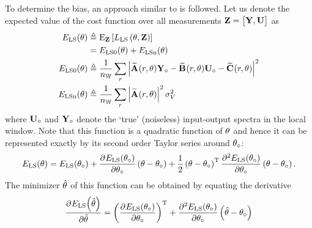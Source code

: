 To determine the bias, an approach similar to \citep[Appendix A]{Guillaume1995} is followed.
Let us denote the expected value of the cost function over all measurements $\LocalVector{Z} = \mat{\LocalMatrix{Y}, \LocalMatrix{U}}$ as
\begin{align}
  \ELSCost{\theta}
              & \isdef 
                   \E[\LocalVector{Z}]%
                         {    
                                \LSCost{\LocalVector{\theta}, \LocalVector{Z}}} \\
              & = \ELSCost[0]{\theta} + \ELSCost[n]{\theta} \\
    \ELSCost[0]{\theta} & \isdef 
            \frac{1}{\nWind} 
                \sum_{r} 
                     \left| 
                             \LocalModel{A}(r, \LocalVector{\theta}) \true{\LocalVector{Y}}
                          - \LocalModel{B}(r, \LocalVector{\theta}) \true{\LocalVector{U}}
                          - \LocalModel{C}(r, \LocalVector{\theta}) 
                    \right|^2 \\
    \ELSCost[n]{\theta} & \isdef 
              \frac{1}{\nWind} 
                     \sum_{r} 
                              \left| \LocalModel{A}(r,\LocalVector{\theta}) \right|^2 
                              \sigma_V^2
\end{align}
where $\true{\LocalVector{U}}$ and $\true{\LocalVector{Y}}$ denote the `true' (noiseless) input-output spectra in the local window.
Note that this function is a quadratic function of $\LocalVector{\theta}$ and hence it can be represented exactly by its second order Taylor series around $\true\theta$:
\begin{multline}
  \ELSCost{\theta} = \ELSCost{\true\theta} 
  + \PartialDerivative{\ELSCost{\true\theta}}{\true\theta}  \left( \theta - \true\theta \right) %
  + \frac{1}{2} \left( \theta - \true\theta \right)^{\T} 
  \PartialDerivative[2]{\ELSCost{\true\theta}}{\true\theta} 
   \left( \theta - \true\theta \right)
   \text{.}
\end{multline}
The minimizer $\estimated\theta$ of this function can be obtained by equating the derivative
\begin{equation}
  \PartialDerivative{\ELSCost{\estimated\theta}}
                                          {\estimated\theta} 
  = 
  \left( \PartialDerivative{\ELSCost{\true\theta}}{\true\theta} \right)^{\T} 
  + \PartialDerivative[2]{\ELSCost{\true\theta}}{\true\theta} \left( \estimated\theta - \true\theta \right)
\end{equation}
